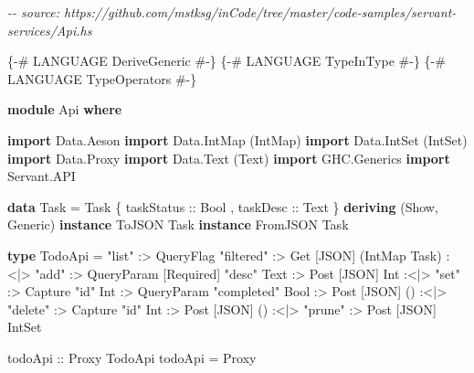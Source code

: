 \documentclass[]{article}
\newenvironment{Shaded}{}{}
\newcommand{\CommentTok}[1]{\textcolor[rgb]{0.38,0.63,0.69}{\textit{#1}}}
\newcommand{\DataTypeTok}[1]{\textcolor[rgb]{0.56,0.13,0.00}{#1}}
\newcommand{\KeywordTok}[1]{\textcolor[rgb]{0.00,0.44,0.13}{\textbf{#1}}}
\newcommand{\NormalTok}[1]{#1}
\newcommand{\OperatorTok}[1]{\textcolor[rgb]{0.40,0.40,0.40}{#1}}
\newcommand{\OtherTok}[1]{\textcolor[rgb]{0.00,0.44,0.13}{#1}}
\newcommand{\StringTok}[1]{\textcolor[rgb]{0.25,0.44,0.63}{#1}}
\begin{document}
\begin{Shaded}
\begin{Highlighting}[]
\CommentTok{{-}{-} source: https://github.com/mstksg/inCode/tree/master/code{-}samples/servant{-}services/Api.hs}

\OtherTok{\{{-}\# LANGUAGE DeriveGeneric \#{-}\}}
\OtherTok{\{{-}\# LANGUAGE TypeInType    \#{-}\}}
\OtherTok{\{{-}\# LANGUAGE TypeOperators \#{-}\}}

\KeywordTok{module} \DataTypeTok{Api} \KeywordTok{where}

\KeywordTok{import}           \DataTypeTok{Data.Aeson}
\KeywordTok{import}           \DataTypeTok{Data.IntMap}\NormalTok{ (}\DataTypeTok{IntMap}\NormalTok{)}
\KeywordTok{import}           \DataTypeTok{Data.IntSet}\NormalTok{ (}\DataTypeTok{IntSet}\NormalTok{)}
\KeywordTok{import}           \DataTypeTok{Data.Proxy}
\KeywordTok{import}           \DataTypeTok{Data.Text}\NormalTok{ (}\DataTypeTok{Text}\NormalTok{)}
\KeywordTok{import}           \DataTypeTok{GHC.Generics}
\KeywordTok{import}           \DataTypeTok{Servant.API}

\KeywordTok{data} \DataTypeTok{Task} \OtherTok{=} \DataTypeTok{Task}
\NormalTok{    \{}\OtherTok{ taskStatus ::} \DataTypeTok{Bool}
\NormalTok{    ,}\OtherTok{ taskDesc   ::} \DataTypeTok{Text}
\NormalTok{    \}}
  \KeywordTok{deriving}\NormalTok{ (}\DataTypeTok{Show}\NormalTok{, }\DataTypeTok{Generic}\NormalTok{)}
\KeywordTok{instance} \DataTypeTok{ToJSON}   \DataTypeTok{Task}
\KeywordTok{instance} \DataTypeTok{FromJSON} \DataTypeTok{Task}

\KeywordTok{type} \DataTypeTok{TodoApi} \OtherTok{=} \StringTok{"list"}   \OperatorTok{:>} \DataTypeTok{QueryFlag} \StringTok{"filtered"}
                        \OperatorTok{:>} \DataTypeTok{Get}\NormalTok{  \textquotesingle{}[}\DataTypeTok{JSON}\NormalTok{] (}\DataTypeTok{IntMap} \DataTypeTok{Task}\NormalTok{)}
          \OperatorTok{:<|>} \StringTok{"add"}    \OperatorTok{:>} \DataTypeTok{QueryParam\textquotesingle{}}\NormalTok{ \textquotesingle{}[}\DataTypeTok{Required}\NormalTok{] }\StringTok{"desc"} \DataTypeTok{Text}
                        \OperatorTok{:>} \DataTypeTok{Post}\NormalTok{ \textquotesingle{}[}\DataTypeTok{JSON}\NormalTok{] }\DataTypeTok{Int}
          \OperatorTok{:<|>} \StringTok{"set"}    \OperatorTok{:>} \DataTypeTok{Capture} \StringTok{"id"} \DataTypeTok{Int}
                        \OperatorTok{:>} \DataTypeTok{QueryParam} \StringTok{"completed"} \DataTypeTok{Bool}
                        \OperatorTok{:>} \DataTypeTok{Post}\NormalTok{ \textquotesingle{}[}\DataTypeTok{JSON}\NormalTok{] ()}
          \OperatorTok{:<|>} \StringTok{"delete"} \OperatorTok{:>} \DataTypeTok{Capture} \StringTok{"id"} \DataTypeTok{Int}
                        \OperatorTok{:>} \DataTypeTok{Post}\NormalTok{ \textquotesingle{}[}\DataTypeTok{JSON}\NormalTok{] ()}
          \OperatorTok{:<|>} \StringTok{"prune"}  \OperatorTok{:>} \DataTypeTok{Post}\NormalTok{ \textquotesingle{}[}\DataTypeTok{JSON}\NormalTok{] }\DataTypeTok{IntSet}

\OtherTok{todoApi ::} \DataTypeTok{Proxy} \DataTypeTok{TodoApi}
\NormalTok{todoApi }\OtherTok{=} \DataTypeTok{Proxy}
\end{Highlighting}
\end{Shaded}
\end{document}
